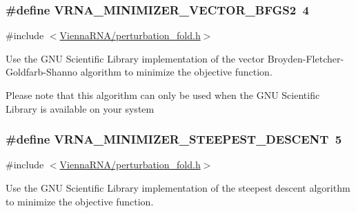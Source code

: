\subsubsection[{\texorpdfstring{V\+R\+N\+A\+\_\+\+M\+I\+N\+I\+M\+I\+Z\+E\+R\+\_\+\+V\+E\+C\+T\+O\+R\+\_\+\+B\+F\+G\+S2}{VRNA_MINIMIZER_VECTOR_BFGS2}}]{\setlength{\rightskip}{0pt plus 5cm}\#define V\+R\+N\+A\+\_\+\+M\+I\+N\+I\+M\+I\+Z\+E\+R\+\_\+\+V\+E\+C\+T\+O\+R\+\_\+\+B\+F\+G\+S2~4}\hypertarget{group__perturbation_ga7b0a65c6c92fa1d8012383ba9d3dcb4f}{}\label{group__perturbation_ga7b0a65c6c92fa1d8012383ba9d3dcb4f}


{\ttfamily \#include $<$\hyperlink{perturbation__fold_8h}{Vienna\+R\+N\+A/perturbation\+\_\+fold.\+h}$>$}



Use the G\+NU Scientific Library implementation of the vector Broyden-\/\+Fletcher-\/\+Goldfarb-\/\+Shanno algorithm to minimize the objective function. 

Please note that this algorithm can only be used when the G\+NU Scientific Library is available on your system 
\subsubsection[{\texorpdfstring{V\+R\+N\+A\+\_\+\+M\+I\+N\+I\+M\+I\+Z\+E\+R\+\_\+\+S\+T\+E\+E\+P\+E\+S\+T\+\_\+\+D\+E\+S\+C\+E\+NT}{VRNA_MINIMIZER_STEEPEST_DESCENT}}]{\setlength{\rightskip}{0pt plus 5cm}\#define V\+R\+N\+A\+\_\+\+M\+I\+N\+I\+M\+I\+Z\+E\+R\+\_\+\+S\+T\+E\+E\+P\+E\+S\+T\+\_\+\+D\+E\+S\+C\+E\+NT~5}\hypertarget{group__perturbation_ga9ecd2144c2ebed7533233da3986521b0}{}\label{group__perturbation_ga9ecd2144c2ebed7533233da3986521b0}


{\ttfamily \#include $<$\hyperlink{perturbation__fold_8h}{Vienna\+R\+N\+A/perturbation\+\_\+fold.\+h}$>$}



Use the G\+NU Scientific Library implementation of the steepest descent algorithm to minimize the objective function. 

